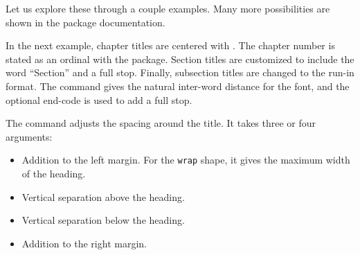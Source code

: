 Let us explore these through a couple examples.
Many more possibilities are shown in the package documentation.

In the next example, chapter titles are centered with .
The chapter number is stated as an ordinal with the  package.
Section titles are customized to include the word ``Section'' and a full stop.
Finally, subsection titles are changed to the run-in format.
The  command gives the natural inter-word distance for the font,
and the optional end-code is used to add a full stop.
%
%

The  command adjusts the spacing around the title.
It takes three or four arguments:
\begin{itemize}
\item Addition to the left margin.
    For the \verb|wrap| shape, it gives the maximum width of the heading.
\item Vertical separation above the heading.
\item Vertical separation below the heading.
\item Addition to the right margin.
\end{itemize}

